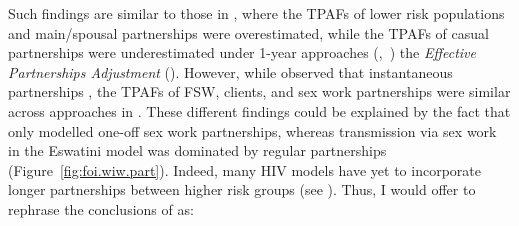 Such findings are similar to those in , where
the TPAFs of lower risk populations and main/spousal partnerships were overestimated, while
the TPAFs of casual partnerships were underestimated
under 1-year approaches (\iry,~\ipy) \vs the \emph{Effective Partnerships Adjustment} (\epa).
However, while \cite{Johnson2016mf} observed that instantaneous partnerships
,
the TPAFs of FSW, clients, and sex work partnerships
were similar across approaches in .
These different findings could be explained by the fact that  %
\cite{Johnson2016mf} only modelled one-off sex work partnerships, %
whereas transmission via sex work in the Eswatini model
was dominated by regular partnerships (Figure~\ref{fig:foi.wiw.part}).
Indeed, many HIV models have yet to incorporate longer partnerships between higher risk groups
(see ).
Thus, I would offer to rephrase the conclusions of \cite{Johnson2016mf} as: %
